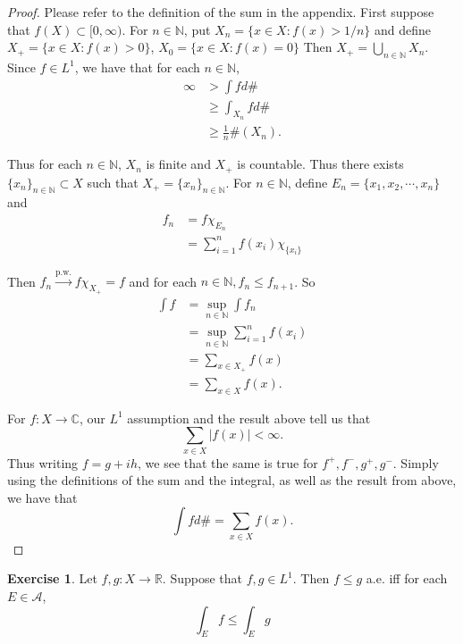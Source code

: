 \documentclass{book}
\theoremstyle{definition}
\newtheorem{ex}[definition]{Exercise}
\newcommand{\C}{\mathbb{C}}
\newcommand{\N}{\mathbb{N}}
\newcommand{\R}{\mathbb{R}}
\newcommand{\MA}{\mathcal{A}}
\newcommand{\lex}[1]{\label{ex:#1}}
\DeclareMathOperator*{\0}{\mbf{0}}
\DeclareMathOperator*{\1}{\mbf{1}}
\newcommand{\Rg}{[0,\infty)}
\begin{document}
	\begin{proof} Please refer to the definition of the sum in the appendix. First suppose that $f(X) \subset \Rg$. For $n \in \N$, put $X_n = \{x \in X: f(x) > 1/n\}$ and define $X_+ = \{x \in X: f(x) > 0\}$, $X_0 = \{x \in X: f(x) = 0\}$ Then $X_+ = \bigcup\limits_{n \in \N}X_n$. Since $f \in L^1$, we have that for each $n \in \N$,
		\begin{align*}
			\infty 
			&> \int f d\#\\
			&\geq \int_{X_n} f d\# \\
			&\geq \frac{1}{n} \#(X_n).
		\end{align*}
		
		Thus for each $n \in \N$, $X_n$ is finite and $X_+$ is countable. Thus there exists $\{x_n\}_{n \in \N} \subset X$ such that $X_+ = \{x_n\}_{n \in \N}$. For $n \in \N$, define $E_n = \{x_1, x_2, \cdots, x_n\}$ and 
		\begin{align*}
			f_n 
			&= f \chi_{E_n}\\
			&= \sum_{i = 1}^n f(x_i)\chi_{\{x_i\}}
		\end{align*}
		
		Then $f_n \xrightarrow{\text{p.w.}} f\chi_{X_+} = f$ and for each $n \in \N, f_n \leq f_{n+1}$. So
		\begin{align*}
			\int f 
			&= \sup_{n \in \N} \int f_n\\
			&= \sup_{n \in \N} \sum_{i =1}^n f(x_i)\\
			&= \sum_{x \in X_+} f(x)\\
			&=\sum_{x \in X} f(x).
		\end{align*} 
		
		For $f:X \rightarrow \C$, our $L^1$ assumption and the result above tell us that $$\sum_{x \in X}|f(x)| < \infty.$$ Thus writing $f = g+ih$, we see that the same is true for $f^+,f^-,g^+,g^-$. Simply using the definitions of the sum and the integral, as well as the result from above, we have that $$\int fd\# = \sum_{x \in X}f(x).$$
	\end{proof}
	
	\begin{ex} \lex{00000} 
		Let $f,g:X \rightarrow \R$. Suppose that $f,g \in L^1$. Then $f \leq g$ a.e. iff for each $E \in \MA$, $$\int_E f \leq \int_E g$$  
	\end{ex}
	
\end{document}
